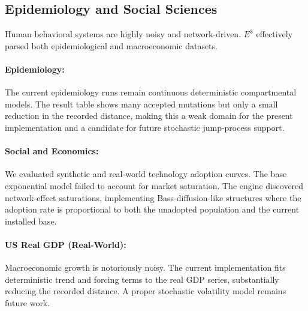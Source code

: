 \subsection{Epidemiology and Social Sciences}

Human behavioral systems are highly noisy and network-driven. $E^3$ effectively parsed both epidemiological and macroeconomic datasets.

\paragraph{Epidemiology:} The current epidemiology runs remain continuous deterministic compartmental models. The result table shows many accepted mutations but only a small reduction in the recorded distance, making this a weak domain for the present implementation and a candidate for future stochastic jump-process support.
\paragraph{Social and Economics:} We evaluated synthetic and real-world technology adoption curves. The base exponential model failed to account for market saturation. The engine discovered network-effect saturations, implementing Bass-diffusion-like structures where the adoption rate is proportional to both the unadopted population and the current installed base.
\paragraph{US Real GDP (Real-World):} Macroeconomic growth is notoriously noisy. The current implementation fits deterministic trend and forcing terms to the real GDP series, substantially reducing the recorded distance. A proper stochastic volatility model remains future work.
